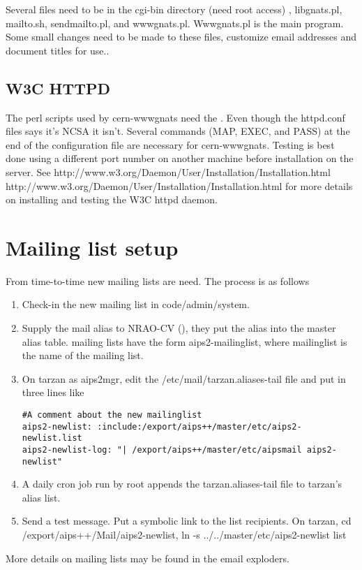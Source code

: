 Several files need to be in the cgi-bin directory (need root access) , libgnats.pl,
mailto.sh, sendmailto.pl, and wwwgnats.pl.  Wwwgnats.pl is the main program.
Some small changes need to be made to these files, customize email addresses
and document titles for \aips use..

\subsection{W3C HTTPD}
The perl scripts used by cern-wwwgnats need the
.  Even
though the httpd.conf files says it's NCSA it isn't. Several commands
(MAP, EXEC, and PASS) at the end of the configuration file are necessary for
cern-wwwgnats.
Testing is best done using a different port number
on another machine before installation on the \aips server.  
See \htmladdnormallink
{http://www.w3.org/Daemon/User/Installation/Installation.html}
{http://www.w3.org/Daemon/User/Installation/Installation.html} for more details
on installing and testing the W3C httpd daemon.
\section{Mailing list setup}
From time-to-time new mailing lists are need.  The process is as follows
\begin{enumerate}

\item Check-in the new mailing list in code/admin/system.
\item Supply the mail alias to NRAO-CV (), they put the alias into the master
alias table.  \aips
mailing lists have the form aips2-mailinglist, where mailinglist is the name
of the mailing list.
\item On tarzan as aips2mgr,
edit the /etc/mail/tarzan.aliases-tail file and put in three lines like
\begin{verbatim}
#A comment about the new mailinglist
aips2-newlist: :include:/export/aips++/master/etc/aips2-newlist.list
aips2-newlist-log: "| /export/aips++/master/etc/aipsmail aips2-newlist"
\end{verbatim}
\item A daily cron job run by root appends the tarzan.aliases-tail file to
tarzan's alias list.
\item Send a test message.  Put a symbolic link to the list recipients.
On tarzan, cd /export/aips++/Mail/aips2-newlist, ln -s ../../master/etc/aips2-newlist list
\end{enumerate}
More details on \aips mailing lists may be found in the
 {email exploders}.
